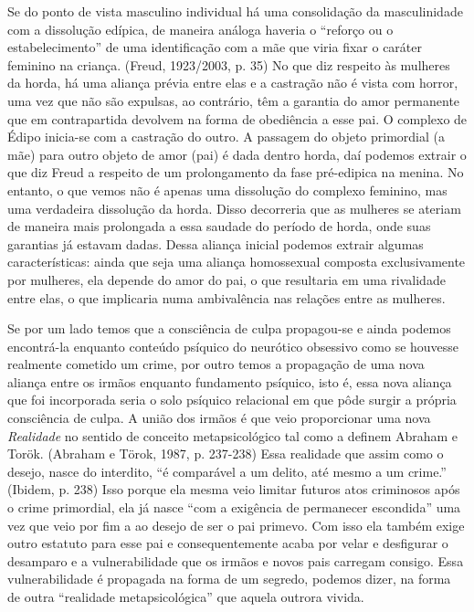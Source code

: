 Se do ponto de vista masculino individual há uma consolidação da
masculinidade com a dissolução edípica, de maneira análoga haveria o
``reforço ou o estabelecimento'' de uma identificação com a mãe que
viria fixar o caráter feminino na criança. (Freud, 1923/2003, p. 35) No
que diz respeito às mulheres da horda, há uma aliança prévia entre elas
e a castração não é vista com horror, uma vez que não são expulsas, ao
contrário, têm a garantia do amor permanente que em contrapartida
devolvem na forma de obediência a esse pai. O complexo de Édipo
inicia-se com a castração do outro. A passagem do objeto primordial (a
mãe) para outro objeto de amor (pai) é dada dentro horda, daí podemos
extrair o que diz Freud a respeito de um prolongamento da fase
pré-edipica na menina. No entanto, o que vemos não é apenas uma
dissolução do complexo feminino, mas uma verdadeira dissolução da horda.
Disso decorreria que as mulheres se ateriam de maneira mais prolongada a
essa saudade do período de horda, onde suas garantias já estavam dadas.
Dessa aliança inicial podemos extrair algumas características: ainda que
seja uma aliança homossexual composta exclusivamente por mulheres, ela
depende do amor do pai, o que resultaria em uma rivalidade entre elas, o
que implicaria numa ambivalência nas relações entre as mulheres.

Se por um lado temos que a consciência de culpa propagou-se e ainda
podemos encontrá-la enquanto conteúdo psíquico do neurótico obsessivo
como se houvesse realmente cometido um crime, por outro temos a
propagação de uma nova aliança entre os irmãos enquanto fundamento
psíquico, isto é, essa nova aliança que foi incorporada seria o solo
psíquico relacional em que pôde surgir a própria consciência de culpa. A
união dos irmãos é que veio proporcionar uma nova \emph{Realidade} no
sentido de conceito metapsicológico tal como a definem Abraham e Torök.
(Abraham e Törok, 1987, p. 237-238) Essa realidade que assim como o
desejo, nasce do interdito, ``é comparável a um delito, até mesmo a um
crime.'' (Ibidem, p. 238) Isso porque ela mesma veio limitar futuros
atos criminosos após o crime primordial, ela já nasce ``com a exigência
de permanecer escondida'' uma vez que veio por fim a ao desejo de ser o
pai primevo. Com isso ela também exige outro estatuto para esse pai e
consequentemente acaba por velar e desfigurar o desamparo e a
vulnerabilidade que os irmãos e novos pais carregam consigo. Essa
vulnerabilidade é propagada na forma de um segredo, podemos dizer, na
forma de outra ``realidade metapsicológica'' que aquela outrora vivida.


